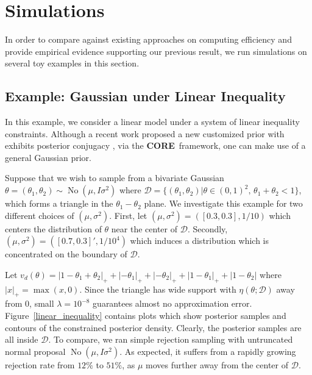 \documentclass[10pt,fleqn]{article}
\newcommand{\core}{\textbf{CORE}}
\newcommand{\mc}[1]{\mathcal{#1}}
\DeclareMathOperator{\No}{No}
\DeclareMathOperator{\1}{\mathbbm{1}}
\begin{document}
\section{Simulations}
In order to compare against existing approaches on computing efficiency and provide empirical evidence
supporting our previous result, we run simulations on several toy examples
 in this section.
   
\subsection{Example: Gaussian  under Linear Inequality}
\label{SEC:Gaussian_Triangle_Constraint_Sampling}
In this example, we consider a linear model under a system of linear inequality constraints. Although a
recent work proposed a new customized prior with exhibits posterior conjugacy \citep{danaher2012minkowski},
via the \core\, framework, one can make use of a general Gaussian prior. 

Suppose that we wish to sample from a bivariate Gaussian $\theta=(\theta_1,\theta_2) \sim \No \left( \mu, I\sigma^2\right)$ where $\mathcal{D}=\{(\theta_1,\theta_2) |\theta\in(0,1)^2, \, \theta_1+\theta_2<1\}$,
which forms a triangle in the $\theta_1-\theta_2$ plane.  We investigate this example for two different choices of $(\mu,\sigma^2)$. First, let $(\mu, \sigma^2)=([0.3,0.3],1/{10})$  which centers the distribution of $\theta$ near the center of $\mc D$. Secondly,  $(\mu,\sigma^2) = ([0.7,0.3]',1/10^4)$  which induces a  distribution which is concentrated on the boundary of $\mc D$. 

Let $v_d(\theta)=|1-\theta_1+\theta_2|_+ + |-\theta_1|_+ + |-\theta_2|_+ +|1-\theta_1|_+ +|1-\theta_2| $ where $|x|_+ = \max(x,0)$.  Since the triangle has wide support with $\eta(\theta;\mc D)$ away from $0$, small $\lambda=10^{-8}$
 guarantees almost no approximation error. Figure~\ref{linear_inequality} contains plots which show posterior samples and contours of the constrained posterior density. Clearly, the posterior samples are all inside
$\mc D$. To compare, we ran simple rejection sampling with untruncated normal proposal $\No ( \mu, I\sigma^2)$. As expected, it  suffers from a rapidly growing rejection rate from $12\%$ to $51\%$, as $\mu$ moves further away from the center of $\mc D$.
\end{document}
